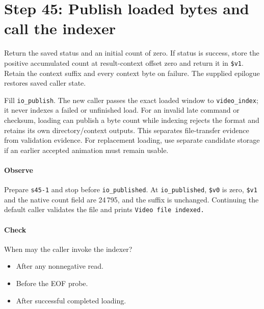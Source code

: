 \section{Step 45: Publish loaded bytes and call the indexer}
Return the saved status and an initial count of zero. If status is success,
store the positive accumulated count at result-context offset zero and return it
in \texttt{\$v1}. Retain the context suffix and every context byte on failure.
The supplied epilogue restores saved caller state.

Fill \texttt{io\_publish}. The new caller passes the exact loaded window to
\texttt{video\_index}; it never indexes a failed or unfinished load. For an
invalid late command or checksum, loading can publish a byte count while indexing
rejects the format and retains its own directory/context outputs. This separates
file-transfer evidence from validation evidence. For replacement loading, use
separate candidate storage if an earlier accepted animation must remain usable.

\paragraph{Observe} Prepare \texttt{s45-1} and stop before
\texttt{io\_published}. At \texttt{io\_published}, \texttt{\$v0} is zero,
\texttt{\$v1} and the native count field are 24\,795, and the suffix is
unchanged. Continuing the default caller validates the file and prints
\texttt{Video file indexed.}

\paragraph{Check} When may the caller invoke the indexer?
\begin{itemize}
  \item[A.] After any nonnegative read.
  \item[B.] Before the EOF probe.
  \item[C.] After successful completed loading.
\end{itemize}
